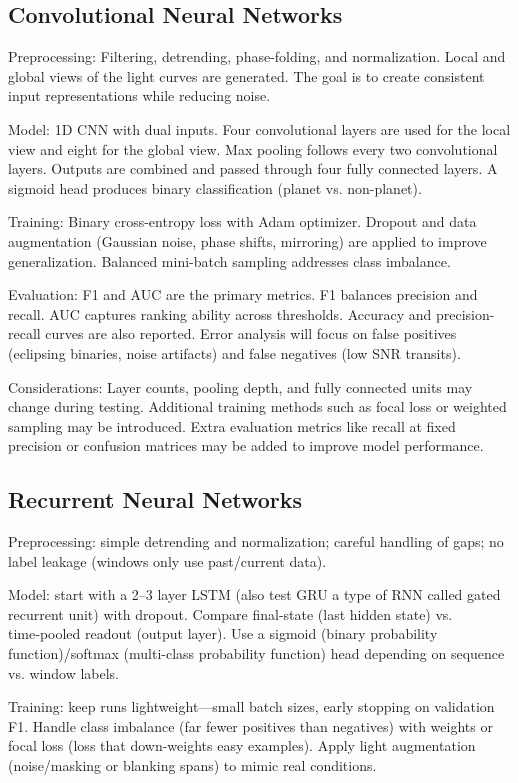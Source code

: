 \documentclass[letterpaper]{article} %
\begin{document}
\subsection*{Convolutional Neural Networks}
{\setlength{\parindent}{0pt}%
 \setlength{\parskip}{0.5\baselineskip}%
Preprocessing: Filtering, detrending, phase-folding, and normalization. Local and global views of the light curves are generated. The goal is to create consistent input representations while reducing noise.

Model: 1D CNN with dual inputs. Four convolutional layers are used for the local view and eight for the global view. Max pooling follows every two convolutional layers. Outputs are combined and passed through four fully connected layers. A sigmoid head produces binary classification (planet vs. non-planet).

Training: Binary cross-entropy loss with Adam optimizer. Dropout and data augmentation (Gaussian noise, phase shifts, mirroring) are applied to improve generalization. Balanced mini-batch sampling addresses class imbalance.

Evaluation: F1 and AUC are the primary metrics. F1 balances precision and recall. AUC captures ranking ability across thresholds. Accuracy and precision-recall curves are also reported. Error analysis will focus on false positives (eclipsing binaries, noise artifacts) and false negatives (low SNR transits).

Considerations: Layer counts, pooling depth, and fully connected units may change during testing. Additional training methods such as focal loss or weighted sampling may be introduced. Extra evaluation metrics like recall at fixed precision or confusion matrices may be added to improve model performance.

\subsection{Recurrent Neural Networks}
Preprocessing: simple detrending and normalization; careful handling of gaps; no label leakage (windows only use past/current data).

Model: start with a 2–3 layer LSTM (also test GRU a type of RNN called gated recurrent unit) with dropout. Compare final-state (last hidden state) vs. time‑pooled readout (output layer). Use a sigmoid (binary probability function)/softmax (multi-class probability function) head depending on sequence vs. window labels.

Training: keep runs lightweight—small batch sizes, early stopping on validation F1. Handle class imbalance (far fewer positives than negatives) with weights or focal loss (loss that down-weights easy examples). Apply light augmentation (noise/masking or blanking spans) to mimic real conditions.

}
\end{document}

